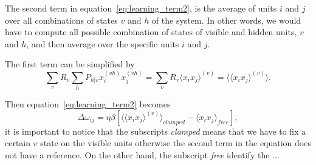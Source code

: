 The second term in equation~\ref{eq:learning_term2}, is the average of units $i$ and $j$ over all combinations of states $v$ and $h$ of the system. 
In other words, we would have to compute all possible combination of states of visible and hidden units, $v$ and $h$, and then average over the specific units $i$ and $j$. 

The first term can be simplified by
\begin{equation}
  \sum_{v} R_{v} \sum_{h} P_{h|v} x^{(vh)}_{i} x^{(vh)}_{j} = \sum_{v} R_{v} \langle x_{i} x_{j} \rangle^{(v)} = \langle \langle x_{i} x_{j} \rangle^{(v)} \rangle.
  \label{eq:clamped_term}
\end{equation}

Then equation~\ref{eq:learning_term2} becomes
\begin{equation}
  \Delta \omega_{ij} = \eta \beta \left[ \langle \langle x_{i} x_{j} \rangle^{(v)} \rangle_{clamped} - \langle x_{i} x_{j} \rangle_{free} \right],
  \label{eq:learning_term3}
\end{equation}
it is important to notice that the subscripts \textit{clamped} means that we have to fix a certain $v$ state on the visible units otherwise the second term in the equation does not have a reference. 
On the other hand, the subscript \textit{free} identify the $\ldots$
